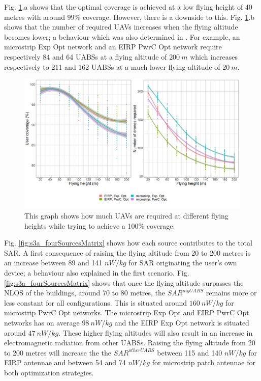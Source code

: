 \documentclass[twocolumn]{phdsymp} %
\begin{document}
Fig. \ref{fig:s3a_numdronesAndCov}.a shows that the optimal coverage is achieved at a low flying height of 
40 metres with around 99\% coverage. 
However, there is a downside to this. 
Fig. \ref{fig:s3a_numdronesAndCov}.b 
 shows that the number of required \gls{UAV}s increases when the flying altitude becomes lower;
a behaviour which was also determined in \cite{J2}.
For example, an microstrip \gls{Exp Opt} network and an \gls{EIRP} \gls{PwrC Opt} network require respectively 84 and 64
\gls{UABS}s at a flying altitude of $200\ m$ which increases respectively to 211 and 162 \gls{UABS}s at a much lower flying altitude of $20\ m$.

\begin{figure}[]
  \includegraphics[width=\linewidth]{../results/s3/fhvsnumdronesAndCov.png}
  \caption{This graph shows how much \acs{UAV}s are required at different flying heights while trying to achieve a 100\% coverage.}
  \label{fig:s3a_numdronesAndCov}
\end{figure}

Fig. \ref{fig:s3a_fourSourcesMatrix} shows how each source contributes to the total \gls{SAR}.
A first consequence of raising the flying altitude from 
 20 to 200 metres is an increase between 89 and 141 $nW/kg$ for \gls{SAR} originating the user's own device; a behaviour also explained in the first scenario.
Fig. \ref{fig:s3a_fourSourcesMatrix} shows that once the flying altitude surpasses the \gls{NLOS} of the buildings, 
around 70 to 80 metres, the $SAR^{myUABS}$ remains 
more or less constant for all configurations.
This is situated around $160\ nW/kg$ for microstrip \gls{PwrC Opt} networks.
The microstrip \gls{Exp Opt} and \gls{EIRP} \gls{PwrC Opt} networks has on average  $98\ nW/kg$
and the \gls{EIRP} \gls{Exp Opt} network is situated around $47\ nW/kg$.
These higher flying altitudes will also result in an increase in electromagnetic radiation from 
other \gls{UABS}s.
Raising the flying altitude from 20 to 200 metres will increase the
the $SAR^{otherUABS}$ between 115 and 140 $nW/kg$ for \gls{EIRP} antennae and between 54 and 74 $nW/kg$ for microstrip patch antennae
for both optimization strategies.
\end{document}
